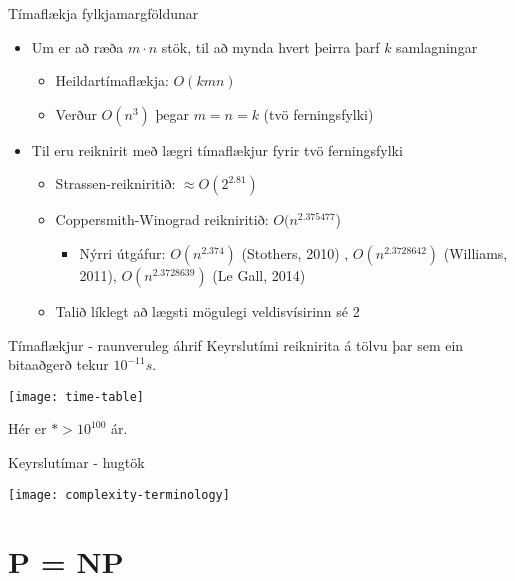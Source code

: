 \documentclass[handout]{beamer}
\begin{document}
\begin{frame}{Tímaflækja fylkjamargföldunar}
\begin{itemize}
 \item Um er að ræða $m \cdot n$ stök, til að mynda hvert þeirra þarf $k$ samlagningar \pause
 \begin{itemize}
  \item Heildartímaflækja: $O(kmn)$
  \item Verður $O(n^3)$ þegar $m = n = k$ (tvö ferningsfylki)
 \end{itemize}\pause
 \item Til eru reiknirit með lægri tímaflækjur fyrir tvö ferningsfylki
 \begin{itemize}
  \item Strassen-reikniritið: $\approx O(2^{2.81})$
  \item Coppersmith-Winograd reikniritið: $O(n^{2.375477}$) \pause
  \begin{itemize}
   \item Nýrri útgáfur: $O(n^{2.374})$ (Stothers, 2010) \pause, $O(n^{2.3728642})$ (Williams, 2011), \pause $O(n^{2.3728639})$ (Le Gall, 2014)
  \end{itemize}
  \item Talið líklegt að lægsti mögulegi veldisvísirinn sé 2
 \end{itemize}
\end{itemize}
\end{frame}

\begin{frame}{Tímaflækjur - raunveruleg áhrif}
Keyrslutími reiknirita á tölvu þar sem ein bitaaðgerð tekur $10^{-11}s$.
\begin{center}
\texttt{[image: time-table]}
\end{center}
Hér er $* > 10^{100}$ ár.
\end{frame}

\begin{frame}{Keyrslutímar - hugtök}
\begin{center}
\texttt{[image: complexity-terminology]}
\end{center}
\end{frame}


\section{P = NP}
\end{document}
